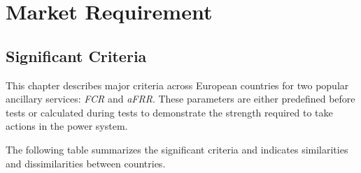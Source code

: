 \chapter{Market Requirement}

\section{Significant Criteria}
This chapter describes major criteria across European countries for two popular ancillary services: \textit{FCR} and \textit{aFRR}. These parameters are either predefined before tests or calculated during tests to demonstrate the strength required to take actions in the power system.

The following table summarizes the significant criteria and indicates similarities and dissimilarities between countries.

